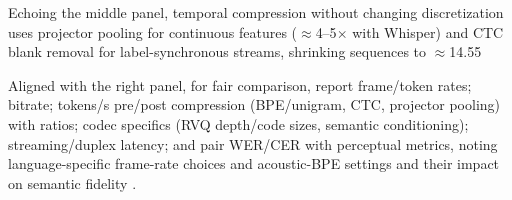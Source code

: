 \documentclass{article}
\begin{document}
Echoing the middle panel, temporal compression without changing discretization uses projector pooling for continuous features ($\approx$4--5$\times$ with Whisper) and CTC blank removal for label-synchronous streams, shrinking sequences to $\approx$14.55%

Aligned with the right panel, for fair comparison, report frame/token rates; bitrate; tokens/s pre/post compression (BPE/unigram, CTC, projector pooling) with ratios; codec specifics (RVQ depth/code sizes, semantic conditioning); streaming/duplex latency; and pair WER/CER with perceptual metrics, noting language-specific frame-rate choices and acoustic-BPE settings and their impact on semantic fidelity \cite{li2024effectivenessacousticbpedecoderonlytts,ye2024codecdoesmatterexploringsemanticshortcom,zhang2025impactframeratesspeechtokenizercasestudy}.

\end{document}
